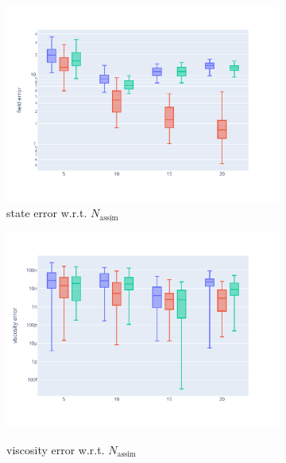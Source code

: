 \begin{figure}[htbp]
\begin{subfigure}{0.45\textwidth}
		\includegraphics[width=\linewidth]{./images/app2d/MSE_na_box.pdf}
		\captionsetup{labelformat=empty}
		\caption{state error w.r.t. $N_{\text{assim}}$}
	\end{subfigure}
	\hfill
	\begin{subfigure}{0.45\textwidth}
		\centering
		\includegraphics[width=\linewidth]{./images/app2d/MSE_visc_na_box.pdf}
		\captionsetup{labelformat=empty}
		\label{fig:na}
		\caption{viscosity error w.r.t. $N_{\text{assim}}$}
	\end{subfigure}
	\begin{subfigure}{0.48\textwidth}
		\captionsetup{labelformat=empty}
		\centering

\end{subfigure}
\end{figure}
